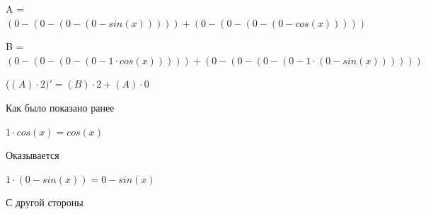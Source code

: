 \documentclass[12pt,a4paper,fleqn]{article}
\begin{document}
\begin{center}
\begin{center}
\begin{center}
\begin{center}
\begin{center}
\begin{center}
\begin{center}
\begin{center}
\begin{center}
\begin{center}
\begin{center}
\begin{center}
\begin{center}
\begin{center}
\begin{center}
\begin{center}
\begin{center}
\begin{center}
\begin{center}
\begin{center}
\begin{center}
\begin{center}
\begin{center}
\begin{center}
\begin{center}
\begin{center}
\begin{center}
\begin{center}
\begin{center}
\begin{center}
\begin{center}
\begin{center}
\begin{center}
\begin{center}
\begin{center}
\begin{center}
\begin{center}
\begin{center}
\begin{center}
\begin{center}
\begin{center}
\begin{center}
\begin{center}
\begin{center}
\begin{center}
\begin{center}
\begin{center}
\begin{center}
\begin{center}
\begin{center}
\begin{center}
\begin{center}
\begin{center}
\begin{center}
\begin{center}
\begin{center}
\begin{center}
\begin{center}
\begin{center}
\begin{center}
\begin{center}
\begin{center}
\begin{center}
\begin{center}
\begin{center}
\begin{center}
\begin{center}
\begin{center}
\begin{center}
\begin{center}
\begin{center}
\begin{center}
\begin{center}
\begin{center}
\begin{center}
\begin{center}
\begin{center}
\begin{center}
\begin{center}
\begin{center}
\begin{center}
A = $(0-(0-(0-(0-sin(x)))))+(0-(0-(0-(0-cos(x)))))$\end{center}
\begin{center}
B = $(0-(0-(0-(0-1 \cdot cos(x)))))+(0-(0-(0-(0-1 \cdot (0-sin(x))))))$\end{center}
\begin{center}
 ($(A) \cdot 2)'
  = (B) \cdot 2+(A) \cdot 0$\end{center}
Как было показано ранее

\begin{center}
$1 \cdot cos(x) = cos(x)$\end{center}
Оказывается

\begin{center}
$1 \cdot (0-sin(x)) = 0-sin(x)$\end{center}
С другой стороны


\end{center}
\end{center}
\end{center}
\end{center}
\end{center}
\end{center}
\end{center}
\end{center}
\end{center}
\end{center}
\end{center}
\end{center}
\end{center}
\end{center}
\end{center}
\end{center}
\end{center}
\end{center}
\end{center}
\end{center}
\end{center}
\end{center}
\end{center}
\end{center}
\end{center}
\end{center}
\end{center}
\end{center}
\end{center}
\end{center}
\end{center}
\end{center}
\end{center}
\end{center}
\end{center}
\end{center}
\end{center}
\end{center}
\end{center}
\end{center}
\end{center}
\end{center}
\end{center}
\end{center}
\end{center}
\end{center}
\end{center}
\end{center}
\end{center}
\end{center}
\end{center}
\end{center}
\end{center}
\end{center}
\end{center}
\end{center}
\end{center}
\end{center}
\end{center}
\end{center}
\end{center}
\end{center}
\end{center}
\end{center}
\end{center}
\end{center}
\end{center}
\end{center}
\end{center}
\end{center}
\end{center}
\end{center}
\end{center}
\end{center}
\end{center}
\end{center}
\end{center}
\end{center}
\end{center}
\end{center}
\end{document}
